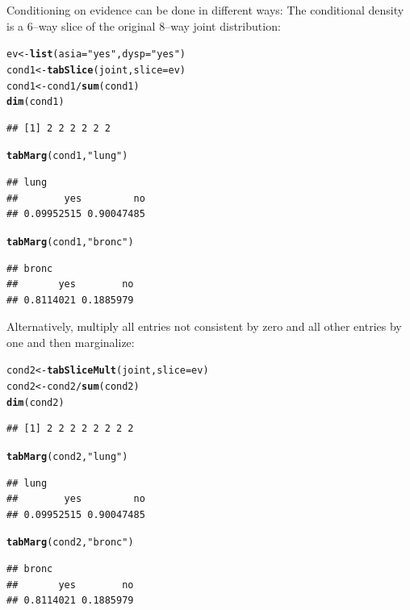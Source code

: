 \documentclass[10pt]{article}\usepackage[]{graphicx}\usepackage[]{xcolor}
\makeatletter
\newcommand{\hlstr}[1]{\textcolor[rgb]{0.192,0.494,0.8}{#1}}%
\newcommand{\hlopt}[1]{\textcolor[rgb]{0,0,0}{#1}}%
\newcommand{\hlstd}[1]{\textcolor[rgb]{0.345,0.345,0.345}{#1}}%
\newcommand{\hlkwb}[1]{\textcolor[rgb]{0.69,0.353,0.396}{#1}}%
\newcommand{\hlkwc}[1]{\textcolor[rgb]{0.333,0.667,0.333}{#1}}%
\newcommand{\hlkwd}[1]{\textcolor[rgb]{0.737,0.353,0.396}{\textbf{#1}}}%
\newenvironment{kframe}{%
 \def\at@end@of@kframe{}%
 \ifinner\ifhmode%
  \def\at@end@of@kframe{\end{minipage}}%
  \begin{minipage}{\columnwidth}%
 \fi\fi%
 \def\FrameCommand##1{\hskip\@totalleftmargin \hskip-\fboxsep
 \colorbox{shadecolor}{##1}\hskip-\fboxsep
     \hskip-\linewidth \hskip-\@totalleftmargin \hskip\columnwidth}%
 \MakeFramed {\advance\hsize-\width
   \@totalleftmargin\z@ \linewidth\hsize
   \@setminipage}}%
 {\par\unskip\endMakeFramed%
 \at@end@of@kframe}
\newenvironment{knitrout}{}{} %
\makeatother
\begin{document}
Conditioning on evidence can be done in different ways: The
conditional density is a $6$--way slice of the original $8$--way joint
distribution:

\begin{knitrout}
\color{fgcolor}\begin{kframe}
\begin{alltt}
\hlstd{ev} \hlkwb{<-} \hlkwd{list}\hlstd{(}\hlkwc{asia}\hlstd{=}\hlstr{"yes"}\hlstd{,} \hlkwc{dysp}\hlstd{=}\hlstr{"yes"}\hlstd{)}
\hlstd{cond1} \hlkwb{<-} \hlkwd{tabSlice}\hlstd{(joint,} \hlkwc{slice}\hlstd{=ev)}
\hlstd{cond1} \hlkwb{<-} \hlstd{cond1} \hlopt{/} \hlkwd{sum}\hlstd{(cond1)}
\hlkwd{dim}\hlstd{(cond1)}
\end{alltt}
\begin{verbatim}
## [1] 2 2 2 2 2 2
\end{verbatim}
\begin{alltt}
\hlkwd{tabMarg}\hlstd{(cond1,} \hlstr{"lung"}\hlstd{)}
\end{alltt}
\begin{verbatim}
## lung
##        yes         no 
## 0.09952515 0.90047485
\end{verbatim}
\begin{alltt}
\hlkwd{tabMarg}\hlstd{(cond1,} \hlstr{"bronc"}\hlstd{)}
\end{alltt}
\begin{verbatim}
## bronc
##       yes        no 
## 0.8114021 0.1885979
\end{verbatim}
\end{kframe}
\end{knitrout}

Alternatively, multiply all entries not consistent by zero and all other entries by one and then marginalize:
\begin{knitrout}
\color{fgcolor}\begin{kframe}
\begin{alltt}
\hlstd{cond2} \hlkwb{<-} \hlkwd{tabSliceMult}\hlstd{(joint,} \hlkwc{slice}\hlstd{=ev)}
\hlstd{cond2} \hlkwb{<-} \hlstd{cond2} \hlopt{/} \hlkwd{sum}\hlstd{(cond2)}
\hlkwd{dim}\hlstd{(cond2)}
\end{alltt}
\begin{verbatim}
## [1] 2 2 2 2 2 2 2 2
\end{verbatim}
\begin{alltt}
\hlkwd{tabMarg}\hlstd{(cond2,} \hlstr{"lung"}\hlstd{)}
\end{alltt}
\begin{verbatim}
## lung
##        yes         no 
## 0.09952515 0.90047485
\end{verbatim}
\begin{alltt}
\hlkwd{tabMarg}\hlstd{(cond2,} \hlstr{"bronc"}\hlstd{)}
\end{alltt}
\begin{verbatim}
## bronc
##       yes        no 
## 0.8114021 0.1885979
\end{verbatim}
\end{kframe}
\end{knitrout}



\end{document}
